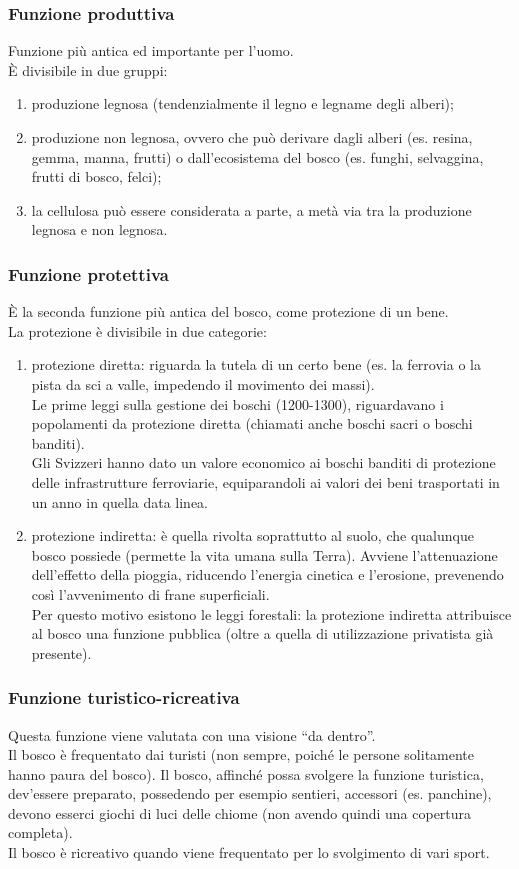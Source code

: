 \subsubsection{Funzione produttiva}
Funzione più antica ed importante per l'uomo.\\
È divisibile in due gruppi:
\begin{enumerate}[nosep]
    \item produzione legnosa (tendenzialmente il legno e legname degli alberi);
    \item produzione non legnosa, ovvero che può derivare dagli alberi (es. resina, gemma, manna, frutti) o dall'ecosistema del bosco (es. funghi, selvaggina, frutti di bosco, felci);
    \item la cellulosa può essere considerata a parte, a metà via tra la produzione legnosa e non legnosa.
\end{enumerate}
\subsubsection{Funzione protettiva}
È la seconda funzione più antica del bosco, come protezione di un bene.\\
La protezione è divisibile in due categorie:
\begin{enumerate}[nosep]
    \item protezione diretta: riguarda la tutela di un certo bene (es. la ferrovia o la pista da sci a valle, impedendo il movimento dei massi).\\
    Le prime leggi sulla gestione dei boschi (1200-1300), riguardavano i popolamenti da protezione diretta (chiamati anche boschi sacri o boschi banditi).\\
    Gli Svizzeri hanno dato un valore economico ai boschi banditi di protezione delle infrastrutture ferroviarie, equiparandoli ai valori dei beni trasportati in un anno in quella data linea.
    \item protezione indiretta: è quella rivolta soprattutto al suolo, che qualunque bosco possiede (permette la vita umana sulla Terra). Avviene l'attenuazione dell'effetto della pioggia, riducendo l'energia cinetica e l'erosione, prevenendo così l'avvenimento di frane superficiali.\\
    Per questo motivo esistono le leggi forestali: la protezione indiretta attribuisce al bosco una funzione pubblica (oltre a quella di utilizzazione privatista già presente). 
\end{enumerate}
\subsubsection{Funzione turistico-ricreativa}
Questa funzione viene valutata con una visione ``da dentro''.\\
Il bosco è frequentato dai turisti (non sempre, poiché le persone solitamente hanno paura del bosco). Il bosco, affinché possa svolgere la funzione turistica, dev'essere preparato, possedendo per esempio sentieri, accessori (es. panchine), devono esserci giochi di luci delle chiome (non avendo quindi una copertura completa).\\
Il bosco è ricreativo quando viene frequentato per lo svolgimento di vari sport. 
